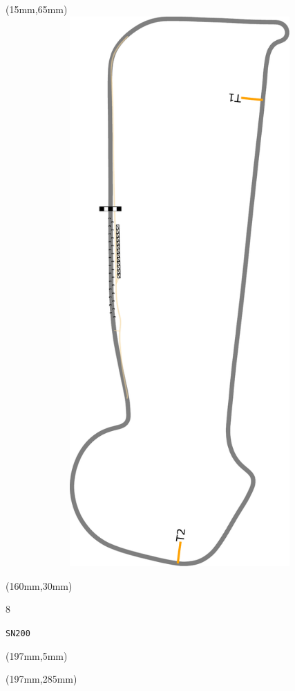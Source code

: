 \begin{textblock*}{185mm}(15mm,65mm)%
\centering
\mbox{\includegraphics[width=185mm,height=210mm,keepaspectratio]{PT/SN200.pdf}}
\end{textblock*}
\begin{textblock*}{40mm}(160mm,30mm)%
\Large
\par{} 
\par8 
\par\hfill\tiny\tt SN200\\
\end{textblock*}
\begin{textblock*}{20mm}(197mm,5mm)%
\fbox{\thepage}
\label{SN200}
\end{textblock*}
\begin{textblock*}{20mm}(197mm,285mm)%
\fbox{\thepage}
\end{textblock*}

